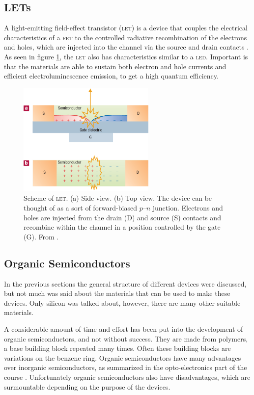 \subsection{LETs}

A light-emitting field-effect transistor (\textsc{let}) is a device that couples the electrical characteristics of a \textsc{fet} to the controlled radiative recombination of the electrons and holes, which are injected into the channel via the source and drain contacts \citep{Muccini}. As seen in figure \ref{fig:LET}, the \textsc{let} also has characteristics similar to a \textsc{led}. Important is that the materials are able to sustain both electron and hole currents and efficient electroluminescence emission, to get a high quantum efficiency.

\begin{figure}[!ht]
 \begin{center}
  \includegraphics[width=0.6\textwidth]{fig_B1}
  \caption{Scheme of \textsc{let}. (a) Side view. (b) Top view. The device can be thought of as a sort of forward-biased $p$--$n$ junction. Electrons and holes are injected from the drain (D) and source (S) contacts and recombine within the channel in a position controlled by the gate (G). From \citet{Muccini}.}
  \label{fig:LET}
 \end{center}
\end{figure}


\subsection{Organic Semiconductors}
In the previous sections the general structure of different devices were discussed, but not much was said about the materials that can be used to make these devices. Only silicon was talked about, however, there are many other suitable materials.

A considerable amount of time and effort has been put into the development of organic semiconductors, and not without success. They are made from polymers, a base building block repeated many times. Often these building blocks are variations on the benzene ring. Organic semiconductors have many advantages over inorganic semiconductors, as summarized in the opto-electronics part of the course \citep{loinotes}. Unfortunately organic semiconductors also have disadvantages, which are surmountable depending on the purpose of the devices.

